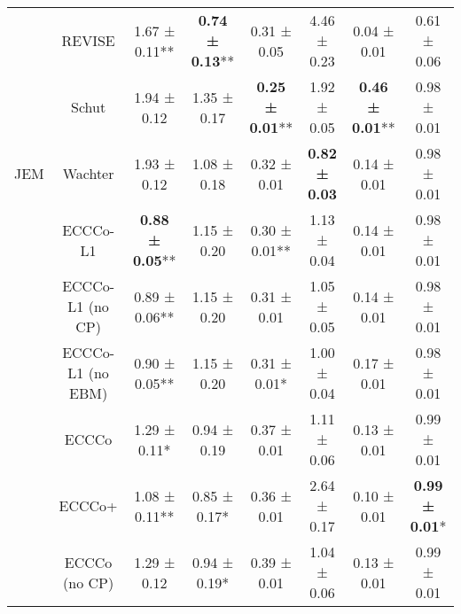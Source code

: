 \begin{table}
{\begin{tabular}[t]{cccccccc}
 & REVISE & 1.67 ± 0.11** & \textbf{0.74 ± 0.13}** & 0.31 ± 0.05\hphantom{*}\hphantom{*} & 4.46 ± 0.23\hphantom{*}\hphantom{*} & 0.04 ± 0.01\hphantom{*}\hphantom{*} & 0.61 ± 0.06\hphantom{*}\hphantom{*}\\

 & Schut & 1.94 ± 0.12\hphantom{*}\hphantom{*} & 1.35 ± 0.17\hphantom{*}\hphantom{*} & \textbf{0.25 ± 0.01}** & 1.92 ± 0.05\hphantom{*}\hphantom{*} & \textbf{0.46 ± 0.01}** & 0.98 ± 0.01\hphantom{*}\hphantom{*}\\

\multirow[t]{-10}{*}{\centering\arraybackslash JEM} & Wachter & 1.93 ± 0.12\hphantom{*}\hphantom{*} & 1.08 ± 0.18\hphantom{*}\hphantom{*} & 0.32 ± 0.01\hphantom{*}\hphantom{*} & \textbf{0.82 ± 0.03}\hphantom{*}\hphantom{*} & 0.14 ± 0.01\hphantom{*}\hphantom{*} & 0.98 ± 0.01\hphantom{*}\hphantom{*}\\
\cmidrule{1-8}
 & ECCCo-L1 & \textbf{0.88 ± 0.05}** & 1.15 ± 0.20\hphantom{*}\hphantom{*} & 0.30 ± 0.01** & 1.13 ± 0.04\hphantom{*}\hphantom{*} & 0.14 ± 0.01\hphantom{*}\hphantom{*} & 0.98 ± 0.01\hphantom{*}\hphantom{*}\\

 & ECCCo-L1 (no CP) & 0.89 ± 0.06** & 1.15 ± 0.20\hphantom{*}\hphantom{*} & 0.31 ± 0.01\hphantom{*}\hphantom{*} & 1.05 ± 0.05\hphantom{*}\hphantom{*} & 0.14 ± 0.01\hphantom{*}\hphantom{*} & 0.98 ± 0.01\hphantom{*}\hphantom{*}\\

 & ECCCo-L1 (no EBM) & 0.90 ± 0.05** & 1.15 ± 0.20\hphantom{*}\hphantom{*} & 0.31 ± 0.01*\hphantom{*} & 1.00 ± 0.04\hphantom{*}\hphantom{*} & 0.17 ± 0.01\hphantom{*}\hphantom{*} & 0.98 ± 0.01\hphantom{*}\hphantom{*}\\

 & ECCCo & 1.29 ± 0.11*\hphantom{*} & 0.94 ± 0.19\hphantom{*}\hphantom{*} & 0.37 ± 0.01\hphantom{*}\hphantom{*} & 1.11 ± 0.06\hphantom{*}\hphantom{*} & 0.13 ± 0.01\hphantom{*}\hphantom{*} & 0.99 ± 0.01\hphantom{*}\hphantom{*}\\

 & ECCCo+ & 1.08 ± 0.11** & 0.85 ± 0.17*\hphantom{*} & 0.36 ± 0.01\hphantom{*}\hphantom{*} & 2.64 ± 0.17\hphantom{*}\hphantom{*} & 0.10 ± 0.01\hphantom{*}\hphantom{*} & \textbf{0.99 ± 0.01}*\hphantom{*}\\

 & ECCCo (no CP) & 1.29 ± 0.12\hphantom{*}\hphantom{*} & 0.94 ± 0.19*\hphantom{*} & 0.39 ± 0.01\hphantom{*}\hphantom{*} & 1.04 ± 0.06\hphantom{*}\hphantom{*} & 0.13 ± 0.01\hphantom{*}\hphantom{*} & 0.99 ± 0.01\hphantom{*}\hphantom{*}\\


\end{tabular}}
\end{table}
